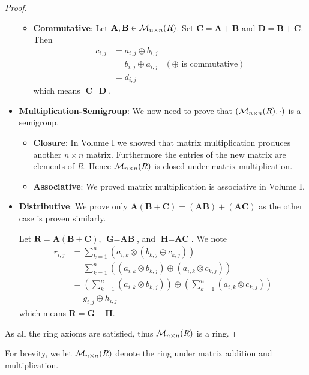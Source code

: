 \begin{proof}
\begin{itemize}
\begin{itemize}
            \item \textbf{Commutative}: Let $\textbf{A}, \textbf{B} \in \mathcal{M}_{n\times n}(R)$. Set $\textbf{C} = \textbf{A} + \textbf{B}$ and $\textbf{D} = \textbf{B} + \textbf{C}$. Then
            \begin{align*}
                c_{i,j} &= a_{i,j} \oplus b_{i,j}\\
                &= b_{i,j} \oplus a_{i,j} & (\oplus \text{ is commutative})\\
                &= d_{i,j}
            \end{align*}
            which means $\textbf{C} = \textbf{D}$.
        \end{itemize}

        \item \textbf{Multiplication-Semigroup}: We now need to prove that $(\mathcal{M}_{n\times n}(R), \cdot)$ is a semigroup.
        \begin{itemize}
            \item \textbf{Closure}: In Volume I we showed that matrix multiplication produces another $n \times n$ matrix. Furthermore the entries of the new matrix are elements of $R$. Hence $\mathcal{M}_{n\times n}(R)$ is closed under matrix multiplication.
        
            \item \textbf{Associative}: We proved matrix multiplication is associative in Volume I.
        \end{itemize}
        
        \item \textbf{Distributive}: We prove only $\textbf{A}(\textbf{B} + \textbf{C}) = (\textbf{AB}) + (\textbf{AC})$ as the other case is proven similarly.
        
        Let $\textbf{R} = \textbf{A}(\textbf{B} + \textbf{C})$, $\textbf{G} = \textbf{AB}$, and $\textbf{H} = \textbf{AC}$. We note
        \begin{align*}
            r_{i,j} &= \sum_{k=1}^n \left(a_{i,k} \otimes \left(b_{k,j} \oplus c_{k,j}\right)\right)\\
            &= \sum_{k=1}^n \left((a_{i,k} \otimes b_{k,j}) \oplus (a_{i,k} \otimes c_{k,j})\right)\\
            &= \left(\sum_{k=1}^n (a_{i,k} \otimes b_{k,j})\right) \oplus \left(\sum_{k=1}^n (a_{i,k} \otimes c_{k,j})\right)\\
            &= g_{i,j}\oplus h_{i,j}
        \end{align*}
        which means $\textbf{R} = \textbf{G} + \textbf{H}$.
    \end{itemize}
    As all the ring axioms are satisfied, thus $\mathcal{M}_{n\times n}(R)$ is a ring.
\end{proof}
For brevity, we let $\mathcal{M}_{n\times n}(R)$ denote the ring under matrix addition and multiplication.

